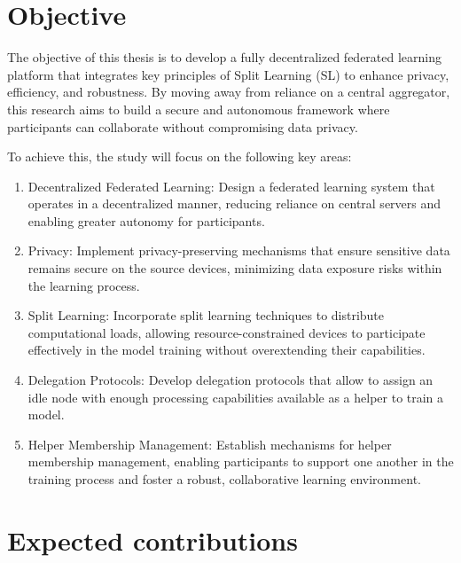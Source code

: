 \section{Objective}
\label{sub:time_is_money}

The objective of this thesis is to develop a fully decentralized federated learning platform that integrates key principles of Split Learning (SL) to enhance privacy, efficiency, and robustness. By moving away from reliance on a central aggregator, this research aims to build a secure and autonomous framework where participants can collaborate without compromising data privacy.


To achieve this, the study will focus on the following key areas:

\begin{enumerate}

 \item {}Decentralized Federated Learning: Design a federated learning system that operates in a decentralized manner, reducing reliance on central servers and enabling greater autonomy for participants.
 
 \item Privacy: Implement privacy-preserving mechanisms that ensure sensitive data remains secure on the source devices, minimizing data exposure risks within the learning process.

 
 \item Split Learning: Incorporate split learning techniques to distribute computational loads, allowing resource-constrained devices to participate effectively in the model training without overextending their capabilities.

 
 \item Delegation Protocols:  Develop delegation protocols that allow to assign an idle node with enough processing capabilities available as a helper to train a model.

\item Helper Membership Management: Establish mechanisms for helper membership management, enabling participants to support one another in the training process and foster a robust, collaborative learning environment.


\end{enumerate}

\section{Expected contributions}
\label{sub:expectedContributions}


